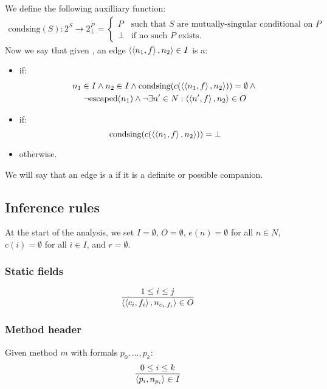 \documentclass[11pt,notitlepage]{article}
\begin{document}
We define the following auxilliary function:
\begin{multline*}
\text{condsing}(S):2^S\to 2^P_\bot = \begin{cases}
P & \text{such that } S \text{ are mutually-singular conditional on }P \\
\bot & \text{if no such }P\text{ exists.}
\end{cases}
\end{multline*}
Now we say that given ,
an edge $\left\langle \left\langle n_1,f \right\rangle,n_2 \right\rangle \in I$ is a:
\begin{itemize}
\item {} if:
\begin{multline*}
 n_1\in I \wedge n_2\in I \wedge
 \text{condsing}(c(\left\langle \left\langle n_1,f \right\rangle,n_2 \right\rangle))=\emptyset \wedge {}\\
 \neg\text{escaped}(n_1) \wedge
 \neg\exists n'\in N: \left\langle \left\langle n',f \right\rangle,n_2 \right\rangle\in O
\end{multline*}
\item {} if:
\begin{displaymath}
 \text{condsing}(c(\left\langle \left\langle n_1,f \right\rangle,n_2 \right\rangle)) = \bot
\end{displaymath}
\item {} otherwise.
\end{itemize}
We will say that an edge is a  if it is a
definite or possible companion.

\subsection{Inference rules}
At the start of the analysis, we set $I=\emptyset$, $O=\emptyset$,
$e(n)=\emptyset$ for all $n\in N$, $c(i)=\emptyset$ for all $i\in I$,
and $r=\emptyset$.

\subsubsection{Static fields}

\begin{displaymath}
\dfrac{1\leq i \leq j}{\left\langle \left\langle c_i,f_i \right\rangle,n_{c_i.f_i} \right\rangle\in O}
\end{displaymath}

\subsubsection{Method header}
Given method $m$ with formals $p_0,\ldots,p_k$:
\begin{displaymath}
\dfrac{0\leq i \leq k}{\left\langle p_i, n_{p_i} \right\rangle\in I}
\end{displaymath}
\end{document}
